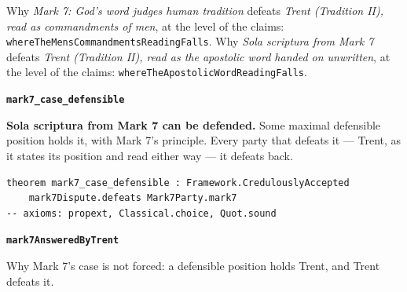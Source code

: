 \documentclass[11pt]{article}
\begin{document}
\noindent Why \emph{Mark 7: God’s word judges human tradition} defeats \emph{Trent (Tradition II), read as commandments of men}, at the level of the claims: \texttt{where\allowbreak{}The\allowbreak{}Mens\allowbreak{}Commandments\allowbreak{}Reading\allowbreak{}Falls}.
\noindent Why \emph{Sola scriptura from Mark 7} defeats \emph{Trent (Tradition II), read as the apostolic word handed on unwritten}, at the level of the claims: \texttt{where\allowbreak{}The\allowbreak{}Apostolic\allowbreak{}Word\allowbreak{}Reading\allowbreak{}Falls}.
\par\medskip\noindent\textbf{\texttt{mark7\_\allowbreak{}case\_\allowbreak{}defensible}}\par\nobreak\noindent
\textbf{Sola scriptura from Mark 7 can be defended.} Some maximal defensible position holds it, with Mark 7’s principle. Every party that defeats it — Trent, as it states its position and read either way — it defeats back.

{\small\begin{verbatim}
theorem mark7_case_defensible : Framework.CredulouslyAccepted
    mark7Dispute.defeats Mark7Party.mark7
-- axioms: propext, Classical.choice, Quot.sound
\end{verbatim}}
\par\medskip\noindent\textbf{\texttt{mark7\allowbreak{}Answered\allowbreak{}By\allowbreak{}Trent}}\par\nobreak\noindent
Why Mark 7’s case is not forced: a defensible position holds Trent, and Trent defeats it.
\end{document}
